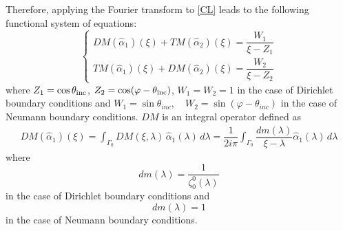 Therefore, applying the Fourier transform to \eqref{CL} leads to the following functional system of equations:
\begin{equation}
\label{functional_eq}
\begin{cases}
DM(\hat{\alpha}_1)(\xi) + TM(\hat{\alpha}_2)(\xi) = \dfrac{W_1}{\xi - Z_1} \\
TM(\hat{\alpha}_1)(\xi) + DM(\hat{\alpha}_2)(\xi)  = \dfrac{W_2}{\xi - Z_2} 
\end{cases}
\end{equation}
where $Z_1 =  \cos \theta_{\rm inc}$, $Z_2 =  \cos (\varphi - \theta_{\rm inc})$, $W_1=W_2=1$ in the case of Dirichlet boundary conditions and $W_1=\sin\theta_{inc}, \quad W_2=\sin(\varphi-\theta_{inc})$ in the case of Neumann boundary conditions. $DM$ is an integral operator defined as
\begin{equation}
\label{DM_operator}
\begin{split}
DM(\hat{\alpha}_1)(\xi) = \int_{\Gamma_0} DM(\xi,\lambda) \, \hat{\alpha}_1(\lambda) \, d \lambda =\dfrac{1}{2i\pi} \int_{\Gamma_0} \dfrac{dm(\lambda)  }{\xi - \lambda} \hat{\alpha}_1(\lambda) \, d\lambda
\end{split}
\end{equation}
where 
\begin{equation}
\label{dmDir}
dm(\lambda) = \dfrac{1}{\zeta_0^0(\lambda)}
\end{equation}
in the case of Dirichlet boundary conditions and 
\begin{equation}
\label{dmNeu}
dm(\lambda)=1
\end{equation}
in the case of Neumann boundary conditions. 

